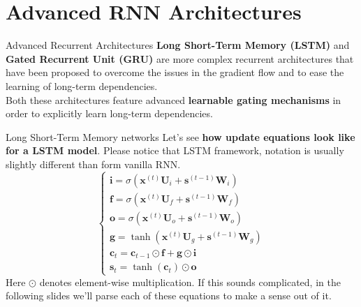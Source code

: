 \documentclass[aspectratio=169]{beamer}
\begin{document}
\section{Advanced RNN Architectures}

\begin{frame}{Advanced Recurrent Architectures}
\textbf{Long Short-Term Memory (LSTM)} and \textbf{Gated Recurrent Unit (GRU)} are more complex recurrent architectures that have been proposed \cite{hochreiter1997long,cho2014learning} to overcome the issues in the gradient flow and to ease the learning of long-term dependencies.\\
\vspace{0.5cm}
Both these architectures feature advanced \textbf{learnable gating mechanisms} in order to explicitly learn long-term dependencies.\\
\end{frame}


\begin{frame}{Long Short-Term Memory networks}
Let's see \textbf{how update equations look like for a LSTM model}. Please notice that LSTM framework, notation is usually slightly different than form vanilla RNN. 
\begin{equation}
	\begin{cases}
	\bm{i} = \sigma(\bm{x}^{(t)}\bm{U}_{i} + \bm{s}^{(t-1)}\bm{W}_{i})\\
	\bm{f} = \sigma(\bm{x}^{(t)}\bm{U}_{f} + \bm{s}^{(t-1)}\bm{W}_{f})\\
	\bm{o} = \sigma(\bm{x}^{(t)}\bm{U}_{o} + \bm{s}^{(t-1)}\bm{W}_{o})\\
	\bm{g} = \tanh(\bm{x}^{(t)}\bm{U}_g + \bm{s}^{(t-1)}\bm{W}_g)\\
	\bm{c}_t = \bm{c}_{t-1} \odot \bm{f} + \bm{g} \odot \bm{i}\\
	\bm{s}_t = \tanh(\bm{c}_t) \odot \bm{o}
	\end{cases}
\end{equation}
Here $\odot$ denotes element-wise multiplication. If this sounds complicated, in the following slides we'll parse each of these equations to make a sense out of it.
\end{frame}

\end{document}
